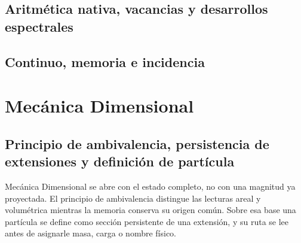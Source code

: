 \chapter{Aritmética nativa, vacancias y desarrollos espectrales}
\label{chap:aritmetica-espectral-rev7}
\HMTDemoteHeadings






\HMTRestoreHeadings

\chapter{Continuo, memoria e incidencia}
\label{chap:sintesis-hmt-rev7}
\HMTDemoteHeadings

\HMTRestoreHeadings

\part{Mecánica Dimensional}

\chapter{Principio de ambivalencia, persistencia de extensiones y definición
de partícula}
\label{chap:particula-rev7}
Mecánica Dimensional se abre con el estado completo, no con una magnitud ya
proyectada. El principio de ambivalencia distingue las lecturas areal y
volumétrica mientras la memoria conserva su origen común. Sobre esa base una
partícula se define como sección persistente de una extensión, y su ruta se
lee antes de asignarle masa, carga o nombre físico.
\HMTDemoteHeadings

\def\HMTIncludeParticleCore{1}

\let\HMTIncludeParticleCore\undefined

\def\HMTIncludeRouteLedgerBlock{1}

\let\HMTIncludeRouteLedgerBlock\undefined


\HMTRestoreHeadings

